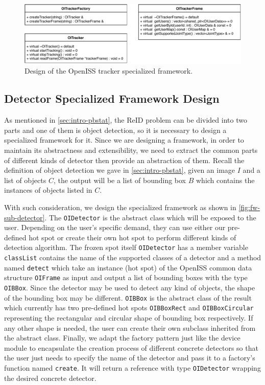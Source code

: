 \begin{figure}
    \centering
    \includegraphics[width=\linewidth]{figures/framework_sub_tracker.pdf}
    \caption{Design of the OpenISS tracker specialized framework.}
    \label{fig:fw-sub-tracker}
\end{figure}

\subsection{Detector Specialized Framework Design}
\label{sec:fw-design-spec-detector}

As mentioned in \autoref{sec:intro-pbstat}, the ReID problem 
can be divided into two parts and one of them is object detection, so it is 
necessary to design a specialized framework for it. Since
we are designing a framework, in order to maintain its abstractness and
extensibility, we need to extract the common parts of different kinds of
detector then provide an abstraction of them.
Recall the definition of object detection we gave in \autoref{sec:intro-pbstat},
given an image $I$ and a list of objects $C$, the output will be a list of
bounding box $B$ which contains the instances of objects listed in $C$.

With such consideration, we design the specialized framework as
shown in \autoref{fig:fw-sub-detector}. The \texttt{OIDetector} is the abstract
class which will be exposed to the user. Depending on the user's specific demand,
they can use either our pre-defined hot spot or create their own hot spot to
perform different kinds of detection algorithm. The frozen spot itself
\texttt{OIDetector} has a member variable \texttt{classList} contains the name
of the supported classes of a detector and a method named \texttt{detect} which
take an instance (hot spot) of the OpenISS common data structure
\texttt{OIFrame} as input and output a list of bounding boxes with the type
\texttt{OIBBox}.
Since the detector may be used to detect any kind of objects, the shape of the
bounding box may be different. \texttt{OIBBox} is the abstract class of the
result which currently has two pre-defined hot spots \texttt{OIBBoxRect} and
\texttt{OIBBoxCircular} representing the rectangular and circular shape of
bounding box respectively. If any other shape is needed, the user can create
their own subclass inherited from the abstract class.
Finally, we adapt the factory pattern just like the device module to
encapsulate the creation process of different concrete detectors so that
the user just needs to specify the name of the detector and pass it to a
factory's function named \texttt{create}. It will return a reference with type
\texttt{OIDetector} wrapping the desired concrete detector.

